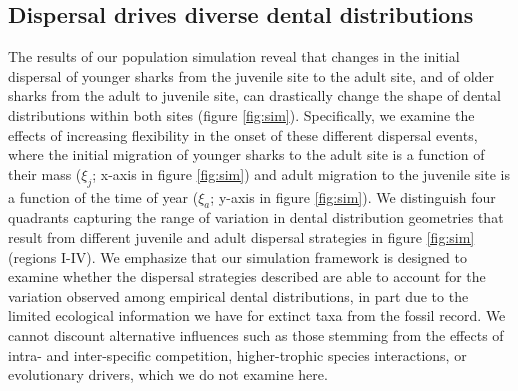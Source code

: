 \documentclass[]{rsos}%
\begin{document}
\subsection{Dispersal drives diverse dental distributions}
The results of our population simulation reveal that changes in the initial dispersal of younger sharks from the juvenile site to the adult site, and of older sharks from the adult to juvenile site, can drastically change the shape of dental distributions within both sites (figure \ref{fig:sim}).
Specifically, we examine the effects of increasing flexibility in the onset of these different dispersal events, where the initial migration of younger sharks to the adult site is a function of their mass ($\xi_j$; x-axis in figure \ref{fig:sim}) and adult migration to the juvenile site is a function of the time of year ($\xi_a$; y-axis in figure \ref{fig:sim}).
We distinguish four quadrants capturing the range of variation in dental distribution geometries that result from different juvenile and adult dispersal strategies in figure \ref{fig:sim} (regions I-IV).
We emphasize that our simulation framework is designed to examine whether the dispersal strategies described are able to account for the variation observed among empirical dental distributions, in part due to the limited ecological information we have for extinct taxa from the fossil record.
We cannot discount alternative influences such as those stemming from the effects of intra- and inter-specific competition, higher-trophic species interactions, or evolutionary drivers, which we do not examine here.
\end{document}
